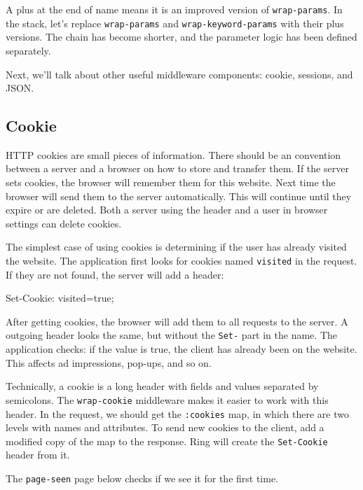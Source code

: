 A plus at the end of name means it is an improved version of \verb|wrap-params|. In the stack, let's replace \verb|wrap-params| and \verb|wrap-keyword-params| with their
plus versions. The chain has become shorter, and the parameter logic has been defined separately.

Next, we'll talk about other useful middleware components: cookie, sessions, and JSON.

\subsection{Cookie}


HTTP cookies are small pieces of information. There should be an convention between a server and a browser on how to store and transfer them. If the server sets cookies,
the browser will remember them for this website. Next time the browser will send them to the server automatically. This will continue until they expire or are deleted. Both a server using the header and a user in browser settings can delete cookies.

The simplest case of using cookies is determining if the user has already visited the website. The application first looks for cookies named \verb|visited| in the request. If they are not found, the server will add a header:

\begin{english}
  \begin{http}
Set-Cookie: visited=true;
  \end{http}
\end{english}

After getting cookies, the browser will add them to all requests to the server. A outgoing header looks the same, but without the \verb|Set-| part in the name. The application checks: if the value is true, the client has already been on the website. This affects ad impressions, pop-ups, and so on.

Technically, a cookie is a long header with fields and values separated by semicolons. The \verb|wrap-cookie| middleware makes it easier to work with this header. In the request, we should get the \verb|:cookies| map, in which there are two levels with names and attributes. To send new cookies to the client, add a modified copy of the map to the response. Ring will create the \verb|Set-Cookie| header from it.

The \verb|page-seen| page below checks if we see it for the first time.

